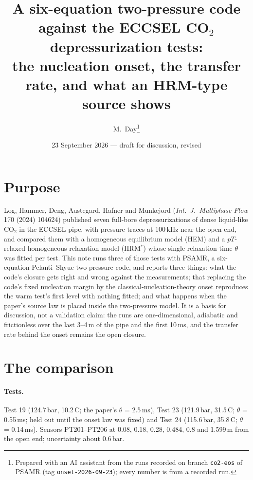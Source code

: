 \documentclass[11pt,a4paper]{article}
\title{A six-equation two-pressure code against the ECCSEL CO$_2$ depressurization tests:\\ the nucleation onset, the transfer rate, and what an HRM-type source shows}
\author{M.\ Day\thanks{Prepared with an AI assistant from the runs recorded on branch \texttt{co2-eos} of PSAMR (tag \texttt{onset-2026-09-23}); every number is from a recorded run.}}
\date{23 September 2026 --- draft for discussion, revised}
\begin{document}
\maketitle

\section*{Purpose}
Log, Hammer, Deng, Austegard, Hafner and Munkejord (\emph{Int.\ J.\ Multiphase Flow} 170 (2024) 104624) published seven full-bore depressurizations of dense liquid-like CO$_2$ in the ECCSEL pipe, with pressure traces at 100\,kHz near the open end, and compared them with a homogeneous equilibrium model (HEM) and a $pT$-relaxed homogeneous relaxation model (HRM$^*$) whose single relaxation time $\theta$ was fitted per test. This note runs three of those tests with PSAMR, a six-equation Pelanti--Shyue two-pressure code, and reports three things: what the code's closure gets right and wrong against the measurements; that replacing the code's fixed nucleation margin by the classical-nucleation-theory onset reproduces the warm test's first level with nothing fitted; and what happens when the paper's source law is placed inside the two-pressure model. It is a basis for discussion, not a validation claim: the runs are one-dimensional, adiabatic and frictionless over the last 3--4\,m of the pipe and the first 10\,ms, and the transfer rate behind the onset remains the open closure.

\section{The comparison}
\paragraph{Tests.} Test 19 (124.7\,bar, 10.2\,\textdegree C; the paper's $\theta$ = 2.5\,ms), Test 23 (121.9\,bar, 31.5\,\textdegree C; $\theta$ = 0.55\,ms; held out until the onset law was fixed) and Test 24 (115.6\,bar, 35.8\,\textdegree C; $\theta$ = 0.14\,ms). Sensors PT201--PT206 at 0.08, 0.18, 0.28, 0.484, 0.8 and 1.599\,m from the open end; uncertainty about 0.6\,bar.
\end{document}
